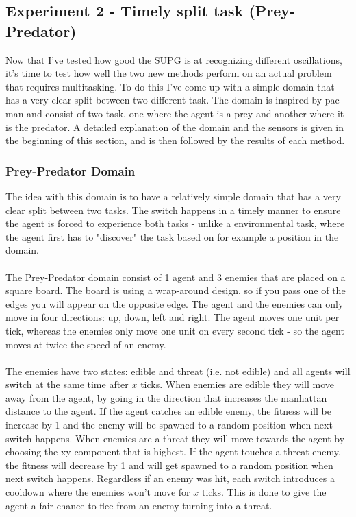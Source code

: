 \documentclass[11pt, a4paper]{article}
\begin{document}
\subsection{Experiment 2 - Timely split task (Prey-Predator)}
Now that I've tested how good the SUPG is at recognizing different oscillations, it's time to test how well the two new methods perform on an actual problem that requires multitasking. To do this I've come up with a simple domain that has a very clear split between two different task. The domain is inspired by pac-man and consist of two task, one where the agent is a prey and another where it is the predator. A detailed explanation of the domain and the sensors is given in the beginning of this section, and is then followed by the results of each method. 
\subsubsection{Prey-Predator Domain}
The idea with this domain is to have a relatively simple domain that has a very clear split between two tasks. The switch happens in a timely manner to ensure the agent is forced to experience both tasks - unlike a environmental task, where the agent first has to "discover" the task based on for example a position in the domain.
\\
\\
The Prey-Predator domain consist of 1 agent and 3 enemies that are placed on a square board. The board is using a wrap-around design, so if you pass one of the edges you will appear on the opposite edge. The agent and the enemies can only move in four directions: up, down, left and right. The agent moves one unit per tick, whereas the enemies only move one unit on every second tick - so the agent moves at twice the speed of an enemy.
\\
\\
The enemies have two states: edible and threat (i.e. not edible) and all agents will switch at the same time after $ x $ ticks. When enemies are edible they will move away from the agent, by going in the direction that increases the manhattan distance to the agent. If the agent catches an edible enemy, the fitness will be increase by 1 and the enemy will be spawned to a random position when next switch happens. When enemies are a threat they will move towards the agent by choosing the xy-component that is highest. If the agent touches a threat enemy, the fitness will decrease by 1 and will get spawned to a random position when next switch happens. Regardless if an enemy was hit, each switch introduces a cooldown where the enemies won't move for $ x $ ticks. This is done to give the agent a fair chance to flee from an enemy turning into a threat.
\end{document}
